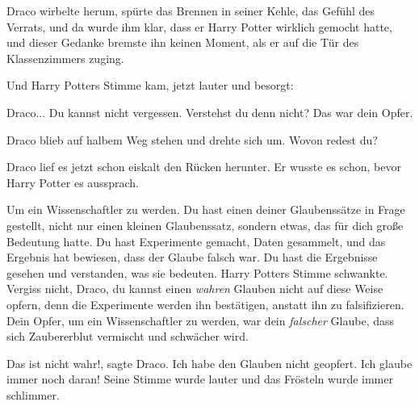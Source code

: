 Draco wirbelte herum, spürte das Brennen in seiner Kehle, das Gefühl des
Verrats, und da wurde ihm klar, dass er Harry Potter wirklich gemocht hatte, und
dieser Gedanke bremste ihn keinen Moment, als er auf die Tür des Klassenzimmers
zuging.

Und Harry Potters Stimme kam, jetzt lauter und besorgt:

\glqq{}Draco... Du kannst nicht vergessen. Verstehst du denn nicht? Das war dein
Opfer.\grqq{}

Draco blieb auf halbem Weg stehen und drehte sich um. \glqq{}Wovon redest
du?\grqq{}

Draco lief es jetzt schon eiskalt den Rücken herunter. Er wusste es schon, bevor
Harry Potter es aussprach.

\glqq{}Um ein Wissenschaftler zu werden. Du hast einen deiner Glaubenssätze in
Frage gestellt, nicht nur einen kleinen Glaubenssatz, sondern etwas, das für
dich große Bedeutung hatte. Du hast Experimente gemacht, Daten gesammelt, und
das Ergebnis hat bewiesen, dass der Glaube falsch war. Du hast die Ergebnisse
gesehen und verstanden, was sie bedeuten.\grqq{} Harry Potters Stimme schwankte.
\glqq{}Vergiss nicht, Draco, du kannst einen \emph{wahren} Glauben nicht auf
diese Weise opfern, denn die Experimente werden ihn bestätigen, anstatt ihn zu
falsifizieren. Dein Opfer, um ein Wissenschaftler zu werden, war dein
\emph{falscher} Glaube, dass sich Zaubererblut vermischt und schwächer
wird.\grqq{}

\glqq{}Das ist nicht wahr!\grqq{}, sagte Draco. \glqq{}Ich habe den Glauben nicht
geopfert. Ich glaube immer noch daran!\grqq{} Seine Stimme wurde lauter und das
Frösteln wurde immer schlimmer.

